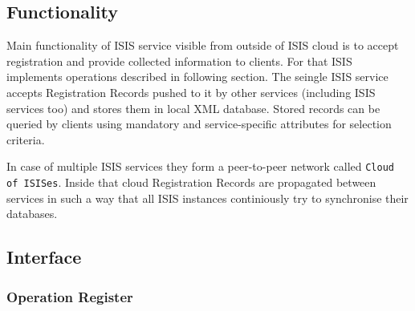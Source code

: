 \documentclass{book}
\begin{document}
\subsection{Functionality} %
\label{sub:isis_functionality}

 Main functionality of ISIS service visible from outside of ISIS cloud is to accept registration and provide collected information to clients. For that ISIS implements operations described in following section.
The seingle ISIS service accepts Registration Records pushed to it by other services (including ISIS services too) and stores them in local XML database. Stored records can be queried by clients using mandatory and service-specific attributes for selection criteria.

 In case of multiple ISIS services they form a peer-to-peer network called \texttt{Cloud of ISISes}. Inside that cloud Registration Records are propagated between services in such a way that all ISIS instances continiously try to synchronise their databases.



\subsection{Interface} %
\label{sub:isis_interface}

\subsubsection{Operation Register}
\end{document}
